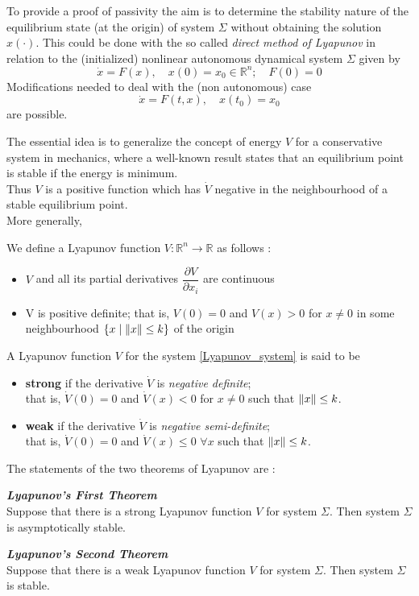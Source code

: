 To provide a proof of passivity the aim is to determine the stability nature of the equilibrium state (at the origin) of system $\varSigma$ without obtaining the solution $x(\cdotp)$.
This could be done with the so called \textit{direct method of Lyapunov} in relation to the (initialized) nonlinear autonomous dynamical system
$\varSigma$ given by
\begin{equation}\label{Lyapunov_system}
	\dot{x} =F(x),\quad x(0)=x_{0} \in \mathbb{R}^{n}; \quad F(0)=0 
\end{equation} 
Modifications needed to deal with the (non autonomous) case 
\[ \dot{x}  = F ( t , x ) , \quad x ( t_{0} ) = x_{0} \]
are possible.

The essential idea is to generalize the concept of energy $V$ for a conservative system in mechanics, where a well-known result states that an equilibrium point is stable if the energy is minimum.
\\Thus $V$ is a positive function which has $\dot{V}$ negative in the neighbourhood of a stable equilibrium point.\\
More generally,
\begin{definition}
	We define a Lyapunov function $V : \mathbb{R}^{n} \rightarrow  \mathbb{R}$ as follows :
	\begin{itemize}
		\item  $V$ and all its partial derivatives $\dfrac{\partial V}{\partial x_{i}}$ are continuous
		\item V is positive definite; that is, $V(0)=0$ and $V(x)>0$ for $x\neq0$ in
		some neighbourhood $\{x \mid \left\lVert x\right\rVert \leq k\}$ of the origin
	\end{itemize}
\end{definition}

A Lyapunov function $V$ for the system \eqref{Lyapunov_system} is said to be
\begin{itemize}
	\item \textbf{strong} if the derivative $\dot{V}$ is \textit{negative definite};\\ that is, $\dot{V}(0) = 0$  and $\dot{V}(x)<0$ for $x\neq0$ such that $\left\lVert x\right\rVert\leq k$.
	\item \textbf{weak} if the derivative $\dot{V}$ is \textit{negative semi-definite};\\that is, $\dot{V}(0) = 0$ and $\dot{V}(x)\leq0$ $\forall x$ such that $\left\lVert x\right\rVert\leq k$.
\end{itemize}

The statements of the two theorems of Lyapunov are :
\begin{theorem}
	\emph{\textbf{Lyapunov’s First Theorem}}\\ Suppose that there is a strong Lyapunov function $V$ for system $\varSigma$. Then system $\varSigma$ is asymptotically stable.
\end{theorem}
\begin{theorem}
	\emph{\textbf{Lyapunov’s Second Theorem}}\\  Suppose that there is a weak Lyapunov function $V$ for system $\varSigma$. Then system $\varSigma$ is stable.
\end{theorem}
